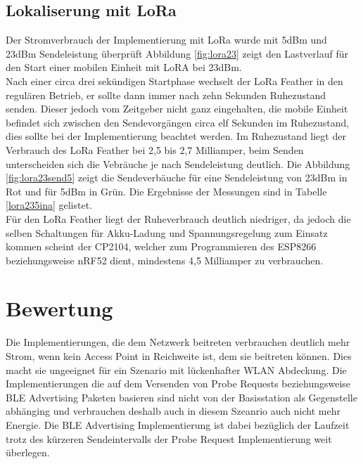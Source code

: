 \subsection{Lokaliserung mit LoRa}
Der Stromverbrauch der Implementierung mit LoRa wurde mit 5dBm und 23dBm Sendeleistung überprüft
Abbildung \ref{fig:lora23} zeigt den Lastverlauf für den Start einer mobilen Einheit mit LoRA bei 23dBm.\\
Nach einer circa drei sekündigen Startphase wechselt der LoRa Feather in den regulären Betrieb, er sollte dann immer nach zehn Sekunden Ruhezustand senden.
Dieser jedoch vom Zeitgeber nicht ganz eingehalten, die mobile Einheit befindet sich zwischen den Sendevorgängen circa elf Sekunden im Ruhezustand, dies sollte bei der Implementierung beachtet werden.
Im Ruhezustand liegt der Verbrauch des LoRa Feather bei 2,5 bis 2,7 Milliamper, beim Senden unterscheiden sich die Vebräuche je nach Sendeleistung deutlich.
Die Abbildung \ref{fig:lora23send5} zeigt die Sendeverbäuche für eine Sendeleistung von 23dBm in Rot und für 5dBm in Grün.
Die Ergebnisse der Messungen sind in Tabelle \ref{lora235ina} gelistet.\\
Für den LoRa Feather liegt der Ruheverbrauch deutlich niedriger, da jedoch die selben Schaltungen für Akku-Ladung und Spannungsregelung zum Einsatz kommen scheint der CP2104, welcher zum Programmieren des ESP8266 beziehungsweise nRF52 dient, mindestens 4,5 Milliamper zu verbrauchen.



\section{Bewertung}
Die Implementierungen, die dem Netzwerk beitreten verbrauchen deutlich mehr Strom, wenn kein Access Point in Reichweite ist, dem sie beitreten können.
Dies macht sie ungeeignet für ein Szenario mit lückenhafter WLAN Abdeckung.
Die Implementierungen die auf dem Versenden von Probe Requests beziehungsweise BLE Advertising Paketen basieren sind nicht von der Basisstation als Gegenstelle abhänging und verbrauchen deshalb auch in diesem Szeanrio auch nicht mehr Energie.
Die BLE Advertising Implementierung ist dabei bezüglich der Laufzeit trotz des kürzeren Sendeintervalls der Probe Request Implementierung weit überlegen.
